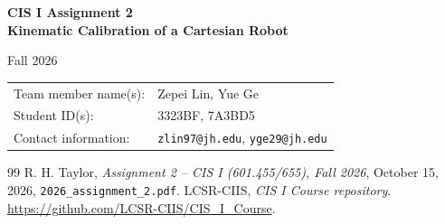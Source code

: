 \documentclass[11pt]{article}
\begin{document}
\begin{titlepage}
\centering
\vspace*{1.5cm}
{\LARGE\bfseries CIS I Assignment 2\\[0.4cm]
Kinematic Calibration of a Cartesian Robot\par}
\vspace{1.5cm}
{\large Fall 2026\par}
\vfill
\begin{tabular}{p{}p{}}
Team member name(s): & Zepei Lin, Yue Ge \\[0.8cm]
Student ID(s): & 3323BF, 7A3BD5 \\[0.8cm]
Contact information: & \texttt{zlin97@jh.edu}, \texttt{yge29@jh.edu}
\end{tabular}
\vfill
\noindent{}
\vfill
\end{titlepage}

\tableofcontents
\clearpage









\clearpage
\begin{thebibliography}{99}
 R. H. Taylor, \emph{Assignment 2 -- CIS I (601.455/655), Fall 2026}, October 15, 2026, \texttt{2026\_assignment\_2.pdf}.
 LCSR-CIIS, \emph{CIS I Course repository}.
\url{https://github.com/LCSR-CIIS/CIS_I_Course}.
\end{thebibliography}
\end{document}
